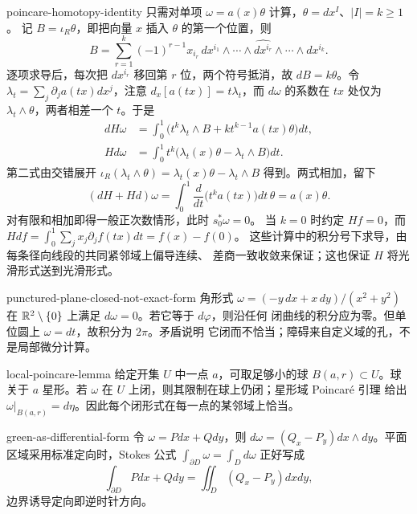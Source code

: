 \begin{solution}{poincare-homotopy-identity}
只需对单项 $\omega=a(x)\theta$ 计算，$\theta=dx^I$、$|I|=k\ge1$。
记 $B=\iota_R\theta$，即把向量 $x$ 插入 $\theta$ 的第一个位置，则
\[
 B=\sum_{r=1}^k(-1)^{r-1}x_{i_r}\,
   dx^{i_1}\wedge\cdots\wedge\widehat{dx^{i_r}}
   \wedge\cdots\wedge dx^{i_k}.
\]
逐项求导后，每次把 $dx^{i_r}$ 移回第 $r$ 位，两个符号抵消，故
$dB=k\theta$。令 $\lambda_t=\sum_j\partial_ja(tx)dx^j$，注意
$d_x[a(tx)]=t\lambda_t$，而 $d\omega$ 的系数在 $tx$ 处仅为
$\lambda_t\wedge\theta$，两者相差一个 $t$。于是
\begin{align*}
 dH\omega&=\int_0^1\bigl(t^k\lambda_t\wedge B
                  +k t^{k-1}a(tx)\theta\bigr)dt,\\
 Hd\omega&=\int_0^1t^k\bigl(\lambda_t(x)\theta-\lambda_t\wedge B\bigr)dt.
\end{align*}
第二式由交错展开
$\iota_R(\lambda_t\wedge\theta)=\lambda_t(x)\theta-\lambda_t\wedge B$
得到。两式相加，留下
\[
 (dH+Hd)\omega=\int_0^1\frac d{dt}\bigl(t^ka(tx)\bigr)dt\,\theta
 =a(x)\theta.
\]
对有限和相加即得一般正次数情形，此时 $s_0^*\omega=0$。
当 $k=0$ 时约定 $Hf=0$，而
$Hdf=\int_0^1\sum_jx_j\partial_j f(tx)dt=f(x)-f(0)$。
这些计算中的积分号下求导，由每条径向线段的共同紧邻域上偏导连续、
差商一致收敛来保证；这也保证 $H$ 将光滑形式送到光滑形式。
\end{solution}

\begin{solution}{punctured-plane-closed-not-exact-form}
角形式 $\omega=(-y\,dx+x\,dy)/(x^2+y^2)$ 在
$\mathbb{R}^2\setminus\{0\}$ 上满足 $d\omega=0$。若它等于 $d\varphi$，则沿任何
闭曲线的积分应为零。但单位圆上 $\omega=dt$，故积分为 $2\pi$。矛盾说明
它闭而不恰当；障碍来自定义域的孔，不是局部微分计算。
\end{solution}

\begin{solution}{local-poincare-lemma}
给定开集 $U$ 中一点 $a$，可取足够小的球 $B(a,r)\subset U$。球关于 $a$
星形。若 $\omega$ 在 $U$ 上闭，则其限制在球上仍闭；星形域 Poincaré 引理
给出 $\omega|_{B(a,r)}=d\eta$。因此每个闭形式在每一点的某邻域上恰当。
\end{solution}

\begin{solution}{green-as-differential-form}
令 $\omega=Pdx+Qdy$，则
$d\omega=(Q_x-P_y)dx\wedge dy$。平面区域采用标准定向时，Stokes 公式
$\int_{\partial D}\omega=\int_Dd\omega$ 正好写成
\[
 \int_{\partial D}Pdx+Qdy=\iint_D(Q_x-P_y)dxdy,
\]
边界诱导定向即逆时针方向。
\end{solution}

